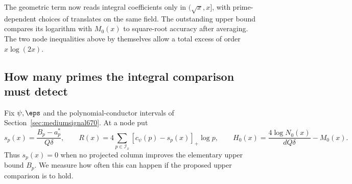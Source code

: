 \documentclass[a4paper,11pt]{article}
\theoremstyle{definition}
\theoremstyle{remark}
\numberwithin{equation}{section}
\begin{document}
The geometric term now reads integral coefficients only in
\((\sqrt x,x]\), with prime-dependent choices of translates on the
same field. The outstanding upper bound compares its logarithm
with \(M_0(x)\) to square-root accuracy after averaging. The two
node inequalities above by themselves allow a total excess of
order \(x\log(2x)\).


\subsection{How many primes the integral comparison must detect}
\label{sec:detected-prime-mass-671}

Fix \(\psi,\eps\) and the polynomial-conductor intervals of
Section~\ref{sec:mediumsignal670}. At a node put
\[
 s_p(x)=\frac{B_p-a_p^*}{Q\delta},\qquad
 R(x)=4\sum_{p\in\mathcal I_x}
                 [c_\psi(p)-s_p(x)]_+\log p,\qquad
 H_0(x)=\frac{4\log N_0(x)}{dQ\delta}-M_0(x).
\]
Thus \(s_p(x)=0\) when no projected column improves the elementary
upper bound \(B_p\). We measure how often this can happen if the
proposed upper comparison is to hold.
\end{document}
